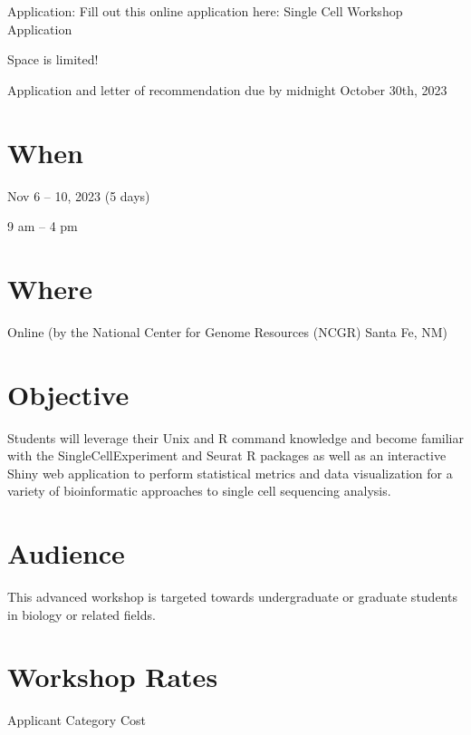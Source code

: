 \documentclass[
]{book}
\begin{document}
Application: Fill out this online application here: Single Cell Workshop Application

Space is limited!

Application and letter of recommendation due by midnight October 30th, 2023

\hypertarget{when-2}{%
\section*{When}\label{when-2}}

Nov 6 -- 10, 2023 (5 days)

9 am -- 4 pm

\hypertarget{where-2}{%
\section*{Where}\label{where-2}}

Online (by the National Center for Genome Resources (NCGR) Santa Fe, NM)

\hypertarget{objective-2}{%
\section*{Objective}\label{objective-2}}

Students will leverage their Unix and R command knowledge and become familiar with the SingleCellExperiment and Seurat R packages as well as an interactive Shiny web application to perform statistical metrics and data visualization for a variety of bioinformatic approaches to single cell sequencing analysis.

\hypertarget{audience-2}{%
\section*{Audience}\label{audience-2}}

This advanced workshop is targeted towards undergraduate or graduate students in biology or related fields.

\hypertarget{workshop-rates-2}{%
\section*{Workshop Rates}\label{workshop-rates-2}}

Applicant Category Cost
\end{document}
